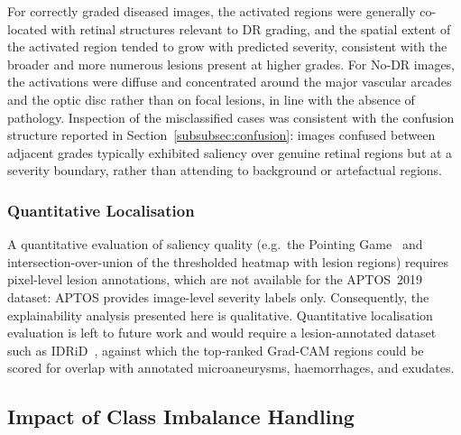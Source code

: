 For correctly graded diseased images, the activated regions were generally
co-located with retinal structures relevant to DR grading, and the spatial extent
of the activated region tended to grow with predicted severity, consistent with the
broader and more numerous lesions present at higher grades. For No-DR images, the
activations were diffuse and concentrated around the major vascular arcades and the
optic disc rather than on focal lesions, in line with the absence of pathology.
Inspection of the misclassified cases was consistent with the confusion structure
reported in Section~\ref{subsubsec:confusion}: images confused between adjacent
grades typically exhibited saliency over genuine retinal regions but at a severity
boundary, rather than attending to background or artefactual regions.


\subsubsection{Quantitative Localisation}
\label{subsubsec:xai_quantitative}

A quantitative evaluation of saliency quality (e.g.\ the Pointing
Game~\cite{zhang2016excitation} and intersection-over-union of the thresholded
heatmap with lesion regions) requires pixel-level lesion annotations, which are not
available for the APTOS~2019 dataset: APTOS provides image-level severity labels
only. Consequently, the explainability analysis presented here is qualitative.
Quantitative localisation evaluation is left to future work and would require a
lesion-annotated dataset such as IDRiD~\cite{porwal2018idrid}, against which the
top-ranked Grad-CAM regions could be scored for overlap with annotated
microaneurysms, haemorrhages, and exudates.

\subsection{Impact of Class Imbalance Handling}
\label{subsec:imbalance_results}

